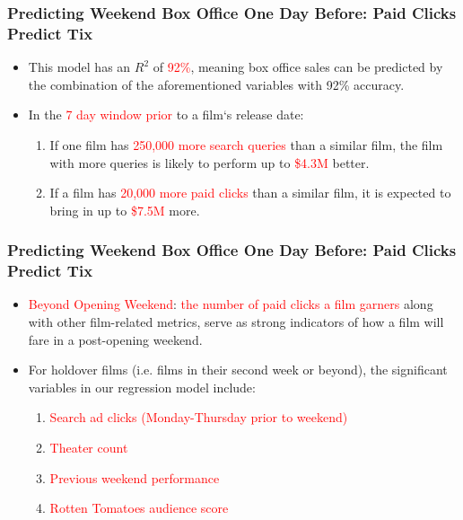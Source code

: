 \documentclass[slidestop,compress,red,mathserif]{beamer}
\begin{document}
\begin{frame}
\frametitle{Predicting Weekend Box Office One Day Before: Paid Clicks Predict Tix}
\begin{itemize}
	\pause \item This model has an $R^2$ of \textcolor{red}{92\%}, meaning box office sales can be predicted by the combination of the aforementioned variables with 92\% accuracy.
	\pause \item In the \textcolor{red}{7 day window prior} to a film`s release date: 
	\begin{enumerate}
		\pause \item If one film has \textcolor{red}{250,000 more search queries} than a similar film, 
			the film with more queries is likely to perform up to \textcolor{red}{\$4.3M} better.
		\pause \item If a film has \textcolor{red}{20,000 more paid clicks} than a similar film, 
			it is expected to bring in up to \textcolor{red}{\$7.5M} more.
	\end{enumerate}
\end{itemize}
\end{frame}
\begin{frame}
\frametitle{Predicting Weekend Box Office One Day Before: Paid Clicks Predict Tix}
\begin{itemize}
	\pause \item \textcolor{red}{Beyond Opening Weekend}: \textcolor{red}{the number of paid clicks a film garners} along with other film-related metrics, 
	serve as strong indicators of how a film will fare in a post-opening weekend.
	\pause \item For holdover films (i.e. films in their second week or beyond), the significant variables in our regression model include:
	\begin{enumerate}
		\pause \item \textcolor{red}{Search ad clicks (Monday-Thursday prior to weekend)}
		\pause \item \textcolor{red}{Theater count}
		\pause \item \textcolor{red}{Previous weekend performance}
		\pause \item \textcolor{red}{Rotten Tomatoes audience score}
	\end{enumerate}
\end{itemize}
\end{frame}
\end{document}
